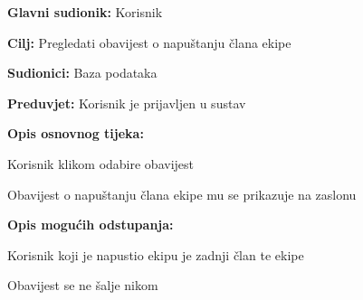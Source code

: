 				\noindent {}
				\begin{packed_item}
					
					\item \textbf{Glavni sudionik: }Korisnik
					\item  \textbf{Cilj:} Pregledati obavijest o napuštanju člana ekipe
					\item  \textbf{Sudionici:} Baza podataka
					\item  \textbf{Preduvjet:} Korisnik je prijavljen u sustav
					\item  \textbf{Opis osnovnog tijeka:}
					
					\item[] \begin{packed_enum}
						
						\item Korisnik klikom odabire obavijest
						\item Obavijest o napuštanju člana ekipe mu se prikazuje na zaslonu
					\end{packed_enum}

					\item  \textbf{Opis mogućih odstupanja:}
					
					\item[] \begin{packed_item}
						
						\item[19.a] Korisnik koji je napustio ekipu je zadnji član te ekipe
						\item[] \begin{packed_enum}
							
							\item Obavijest se ne šalje nikom
							
						\end{packed_enum}

					\end{packed_item}
					
				\end{packed_item}


